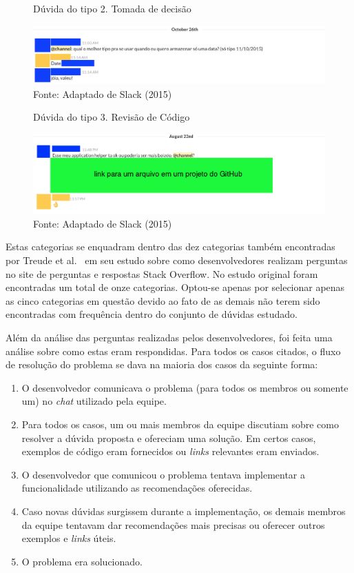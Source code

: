 \begin{figure}[h!]
	\centering
    \caption{Dúvida do tipo 2. Tomada de decisão}
		\label{fig:doubt-2}
    \includegraphics[width=15cm]{Imagens/c-type-2-1-1.png}
	\caption*{Fonte: Adaptado de Slack (2015)}
\end{figure}

\begin{figure}[h!]
	\centering
    \caption{Dúvida do tipo 3. Revisão de Código}
		\label{fig:doubt-3}
    \includegraphics[width=15cm]{Imagens/c-type-3-1-1.png}
	\caption*{Fonte: Adaptado de Slack (2015)}
\end{figure}

Estas categorias se enquadram dentro das dez categorias também encontradas por Treude et al.~\cite{Treude2011} em seu estudo sobre como desenvolvedores realizam perguntas no site de perguntas e respostas Stack Overflow. No estudo original foram encontradas um total de onze categorias. Optou-se apenas por selecionar apenas as cinco categorias em questão devido ao fato de as demais não terem sido encontradas com frequência dentro do conjunto de dúvidas estudado.

\clearpage

Além da análise das perguntas realizadas pelos desenvolvedores, foi feita uma análise sobre como estas eram respondidas. Para todos os casos citados, o fluxo de resolução do problema se dava na maioria dos casos da seguinte forma:

\begin{enumerate}[i]
  \item O desenvolvedor comunicava o problema (para todos os membros ou somente um) no \textit{chat} utilizado pela equipe.
  \item Para todos os casos, um ou mais membros da equipe discutiam sobre como resolver a dúvida proposta e ofereciam uma solução. Em certos casos, exemplos de código eram fornecidos ou \textit{links} relevantes eram enviados.
  \item O desenvolvedor que comunicou o problema tentava implementar a funcionalidade utilizando as recomendações oferecidas.
  \item Caso novas dúvidas surgissem durante a implementação, os demais membros da equipe tentavam dar recomendações mais precisas ou oferecer outros exemplos e \textit{links} úteis.
  \item O problema era solucionado.
\end{enumerate}


